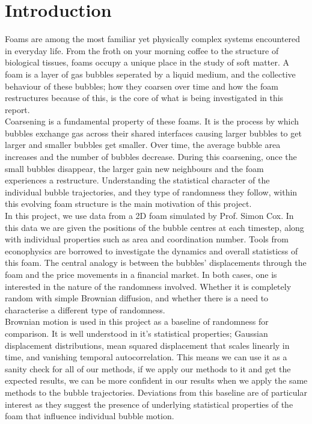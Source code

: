 \section{Introduction} \label{sec:introduction}
Foams are among the most familiar yet physically complex systems encountered in everyday life. From the froth on your morning coffee to the structure of biological tissues, foams occupy a unique place in the study of soft matter. A foam is a layer of gas bubbles seperated by a liquid medium, and the collective behaviour of these bubbles; how they coarsen over time and how the foam restructures because of this, is the core of what is being investigated in this report.\\

Coarsening is a fundamental property of these foams. It is the process by which bubbles exchange gas across their shared interfaces causing larger bubbles to get larger and smaller bubbles get smaller. Over time, the average bubble area increases and the number of bubbles decrease. During this coarsening, once the small bubbles disappear, the larger gain new neighbours and the foam experiences a restructure. Understanding the statistical character of the individual bubble trajectories, and they type of randomness they follow, within this evolving foam structure is the main motivation of this project.\\

In this project, we use data from a 2D foam simulated by Prof. Simon Cox. In this data we are given the positions of the bubble centres at each timestep, along with individual properties such as area and coordination number. Tools from econophysics are borrowed to investigate the dynamics and overall statisticss of this foam. The central analogy is between the bubbles' displacements through the foam and the price movements in a financial market. In both cases, one is interested in the nature of the randomness involved. Whether it is completely random with simple Brownian diffusion, and whether there is a need to characterise a different type of randomness.\\

Brownian motion is used in this project as a baseline of randomness for comparison. It is well understood in it's statistical properties; Gaussian displacement distributions, mean squared displacement that scales linearly in time, and vanishing temporal autocorrelation. This means we can use it as a sanity check for all of our methods, if we apply our methods to it and get the expected results, we can be more confident in our results when we apply the same methods to the bubble trajectories. Deviations from this baseline are of particular interest as they suggest the presence of underlying statistical properties of the foam that influence individual bubble motion.\\

